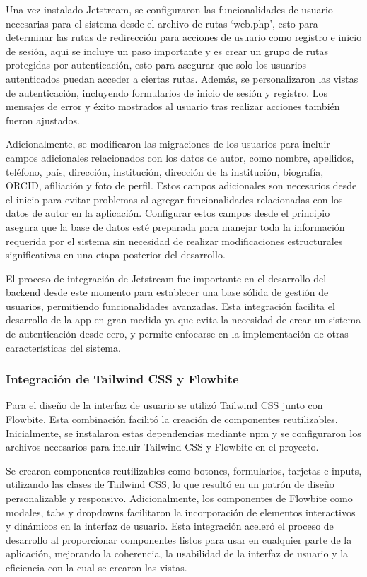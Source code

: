 Una vez instalado Jetstream, se configuraron las funcionalidades de usuario necesarias para el sistema desde el archivo de rutas `web.php', esto para determinar las rutas de redirección para acciones de usuario como registro e inicio de sesión, aqui se incluye un paso importante y es crear un grupo de rutas protegidas por autenticación, esto para asegurar que solo los usuarios autenticados puedan acceder a ciertas rutas. Además, se personalizaron las vistas de autenticación, incluyendo formularios de inicio de sesión y registro. Los mensajes de error y éxito mostrados al usuario tras realizar acciones también fueron ajustados.

Adicionalmente, se modificaron las migraciones de los usuarios para incluir campos adicionales relacionados con los datos de autor, como nombre, apellidos, teléfono, país, dirección, institución, dirección de la institución, biografía, ORCID, afiliación y foto de perfil. Estos campos adicionales son necesarios desde el inicio para evitar problemas al agregar funcionalidades relacionadas con los datos de autor en la aplicación. Configurar estos campos desde el principio asegura que la base de datos esté preparada para manejar toda la información requerida por el sistema sin necesidad de realizar modificaciones estructurales significativas en una etapa posterior del desarrollo.

El proceso de integración de Jetstream fue importante en el desarrollo del backend desde este momento para establecer una base sólida de gestión de usuarios, permitiendo funcionalidades avanzadas. Esta integración facilita el desarrollo de la app en gran medida ya que evita la necesidad de crear un sistema de autenticación desde cero, y permite enfocarse en la implementación de otras características del sistema.

\subsubsection{Integración de Tailwind CSS y Flowbite}
Para el diseño de la interfaz de usuario se utilizó Tailwind CSS junto con Flowbite. Esta combinación facilitó la creación de componentes reutilizables. Inicialmente, se instalaron estas dependencias mediante npm y se configuraron los archivos necesarios para incluir Tailwind CSS y Flowbite en el proyecto.

Se crearon componentes reutilizables como botones, formularios, tarjetas e inputs, utilizando las clases de Tailwind CSS, lo que resultó en un patrón de diseño personalizable y responsivo. Adicionalmente, los componentes de Flowbite como modales, tabs y dropdowns facilitaron la incorporación de elementos interactivos y dinámicos en la interfaz de usuario. Esta integración aceleró el proceso de desarrollo al proporcionar componentes listos para usar en cualquier parte de la aplicación, mejorando la coherencia, la usabilidad de la interfaz de usuario y la eficiencia con la cual se crearon las vistas.

